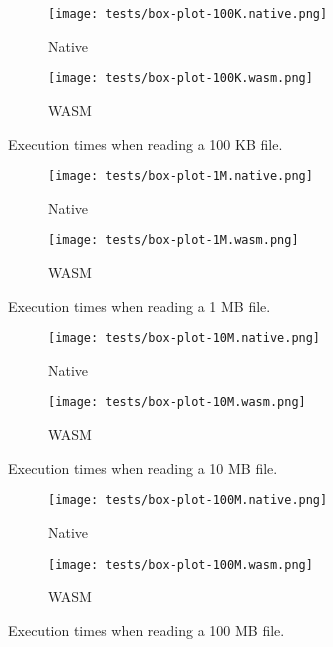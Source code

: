\begin{figure}[ht!]
  \centering

  \begin{subfigure}[b]{0.49\textwidth}
    \centering
    \texttt{[image: tests/box-plot-100K.native.png]}
    \caption{Native}
  \end{subfigure}
  \begin{subfigure}[b]{0.49\textwidth}
    \centering
    \texttt{[image: tests/box-plot-100K.wasm.png]}
    \caption{WASM}
  \end{subfigure}

  \caption{Execution times when reading a 100 KB file.}
  \label{fig:distribution-reading-100k}
\end{figure}

\begin{figure}[ht!]
  \begin{subfigure}[b]{0.49\textwidth}
    \centering
    \texttt{[image: tests/box-plot-1M.native.png]}
    \caption{Native}
  \end{subfigure}
  \begin{subfigure}[b]{0.49\textwidth}
    \centering
    \texttt{[image: tests/box-plot-1M.wasm.png]}
    \caption{WASM}
  \end{subfigure}

  \caption{Execution times when reading a 1 MB file.}
  \label{fig:distribution-reading-1M}
\end{figure}

\begin{figure}[ht!]
  \begin{subfigure}[b]{0.49\textwidth}
    \centering
    \texttt{[image: tests/box-plot-10M.native.png]}
    \caption{Native}
  \end{subfigure}
  \begin{subfigure}[b]{0.49\textwidth}
    \centering
    \texttt{[image: tests/box-plot-10M.wasm.png]}
    \caption{WASM}
  \end{subfigure}

  \caption{Execution times when reading a 10 MB file.}
  \label{fig:distribution-reading-10M}
\end{figure}

\begin{figure}[ht!]
  \begin{subfigure}[b]{0.49\textwidth}
    \centering
    \texttt{[image: tests/box-plot-100M.native.png]}
    \caption{Native}
  \end{subfigure}
  \begin{subfigure}[b]{0.49\textwidth}
    \centering
    \texttt{[image: tests/box-plot-100M.wasm.png]}
    \caption{WASM}
  \end{subfigure}

  \caption{Execution times when reading a 100 MB file.}
  \label{fig:distribution-reading-100M}
\end{figure}

